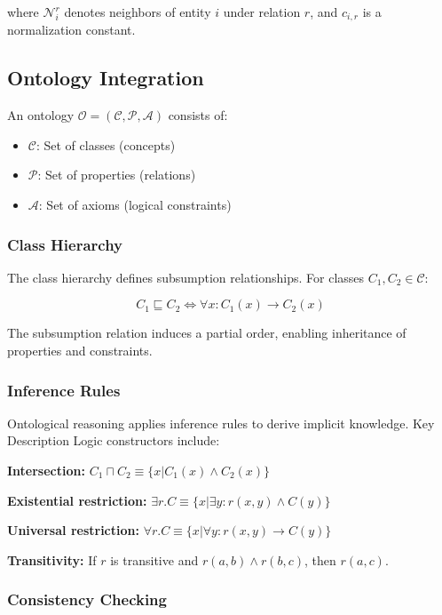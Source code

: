\documentclass[conference]{IEEEtran}
\begin{document}
where $\mathcal{N}_i^r$ denotes neighbors of entity $i$ under relation $r$, and $c_{i,r}$ is a normalization constant.

\subsection{Ontology Integration}

An ontology $\mathcal{O} = (\mathcal{C}, \mathcal{P}, \mathcal{A})$ consists of:
\begin{itemize}
    \item $\mathcal{C}$: Set of classes (concepts)
    \item $\mathcal{P}$: Set of properties (relations)
    \item $\mathcal{A}$: Set of axioms (logical constraints)
\end{itemize}

\subsubsection{Class Hierarchy}

The class hierarchy defines subsumption relationships. For classes $C_1, C_2 \in \mathcal{C}$:

\begin{equation}
C_1 \sqsubseteq C_2 \Leftrightarrow \forall x: C_1(x) \rightarrow C_2(x)
\end{equation}

The subsumption relation induces a partial order, enabling inheritance of properties and constraints.

\subsubsection{Inference Rules}

Ontological reasoning applies inference rules to derive implicit knowledge. Key Description Logic constructors include:

\textbf{Intersection:} $C_1 \sqcap C_2 \equiv \{x | C_1(x) \land C_2(x)\}$

\textbf{Existential restriction:} $\exists r.C \equiv \{x | \exists y: r(x,y) \land C(y)\}$

\textbf{Universal restriction:} $\forall r.C \equiv \{x | \forall y: r(x,y) \rightarrow C(y)\}$

\textbf{Transitivity:} If $r$ is transitive and $r(a,b) \land r(b,c)$, then $r(a,c)$.

\subsubsection{Consistency Checking}
\end{document}
